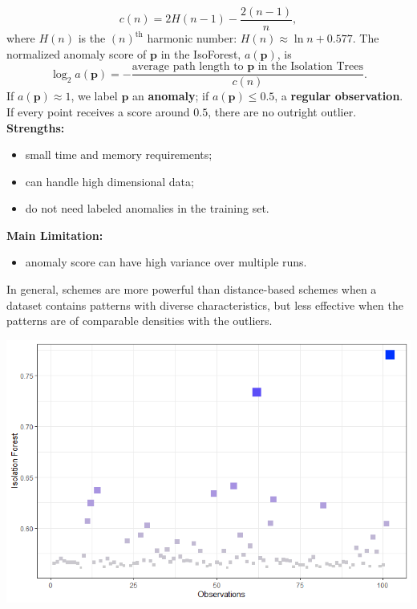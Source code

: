 \documentclass[20pt,landscape,footrule,headrule]{foils}
\newcommand{\newl}{\newline\newline}
\def\fh{\foilhead}
\begin{document}
{{$$
c(n) 
= 2 H(n-1) - \frac{2(n-1)}{n},
$$
where $H(n)$ is the $(n)^{\text{th}}$ harmonic number: $ H(n)\approx \ln n + 0.577.$\newl 
The normalized anomaly score of $\mathbf{p}$ in the IsoForest, $a(\mathbf{p})$,   is 
$$
\log_2 a(\mathbf{p})
= -\frac{\text{average path length to $\mathbf{p}$ in the Isolation Trees}}{c(n)}.
$$
If $a(\mathbf{p}) \approx 1$, we label $\mathbf{p}$ an \textbf{anomaly}; if  $a(\mathbf{p}) \leq 0.5$, a \textbf{regular observation}. If every point receives a score around $0.5$, there are no outright outlier. 
\newpage\ \\ \noindent \textbf{Strengths:} 
\begin{itemize}
\item small time and memory requirements;\item  can handle high dimensional data; \item do not need labeled anomalies in the training set.
\end{itemize} \textbf{Main Limitation:}
\begin{itemize}
\item anomaly score can have high variance over multiple runs.
\end{itemize}
In general,  schemes are more powerful than distance-based schemes when a dataset contains patterns with diverse characteristics, but less effective when the patterns are of comparable densities with the outliers.

\newpage
\begin{center}
\includegraphics[width=\textwidth]{Images/IsoForest}
\end{center}


\fh{\textcolor{darkestgreen}{
6.3 -- Qualitative Methods}} \label{6.3} 

}}
\end{document}
